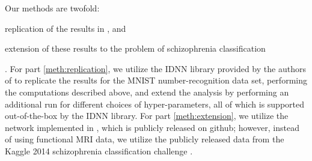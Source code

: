 \documentclass[conference, 5pt]{IEEEtran}
\begin{document}
Our methods are twofold: \begin{enumerate*} \item \label{meth:replication} replication of the results in \cite{shwartz2017opening}, and \item \label{meth:extension} extension of these results to the problem of schizophrenia classification \end{enumerate*}. For part \ref{meth:replication}, we utilize the IDNN library provided by the authors of \cite{shwartz2017opening} to replicate the results for the MNIST number-recognition data set, performing the computations described above, and extend the analysis by performing an additional run for different choices of hyper-parameters, all of which is supported out-of-the-box by the IDNN library. For part \ref{meth:extension}, we utilize the network implemented in \cite{kim2016deep}, which is publicly released on github; however, instead of using functional MRI data, we utilize the publicly released data from the Kaggle 2014 schizophrenia classification challenge \cite{silva2014tenth}.





\end{document}
